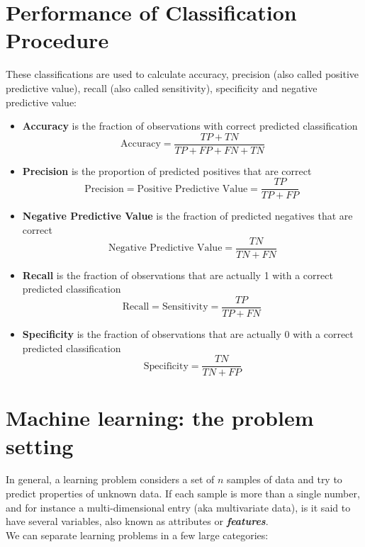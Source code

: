 \documentclass[]{article}
\begin{document}
	\tableofcontents
	\newpage
	\section{Performance of Classification Procedure}
	
	These classifications are used to calculate accuracy, precision (also called positive predictive value), recall (also called sensitivity), specificity and negative predictive value:
	
	\begin{itemize}
		\item  \textbf{Accuracy} is the fraction of observations with correct predicted classification
		\[ \mbox{Accuracy}=\frac{TP+TN}{TP+FP+FN+TN}\]
		
		
		\item \textbf{Precision} is the proportion of predicted positives that are correct
		\[
		\mbox{Precision} = \mbox{Positive Predictive Value} =\frac{TP}{TP+FP} \, \]
		
		\item \textbf{Negative Predictive Value} is the  fraction of predicted negatives that are correct
		\[\mbox{Negative Predictive Value} = \frac{TN}{TN+FN}\]
		
		\item \textbf{Recall} is the fraction of observations that are actually 1 with a correct predicted classification
		\[ 
		\mbox{Recall} = \mbox{Sensitivity} = \frac{TP}{TP+FN} \,  \]
		
		\item \textbf{Specificity} is the fraction of observations that are actually 0 with a correct predicted classification
		\[ \mbox{Specificity} = \frac{TN}{TN+FP} \]
		
	\end{itemize}

\newpage	
\section{Machine learning: the problem setting}
	
	\noindent In general, a learning problem considers a set of $n$ samples of data and try to predict properties of unknown data. If
	each sample is more than a single number, and for instance a multi-dimensional entry (aka multivariate data), is it said
	to have several variables, also known as attributes or \textbf{\textit{features}}.\\
	\bigskip
	We can separate learning problems in a few large categories:
	
\end{document}
